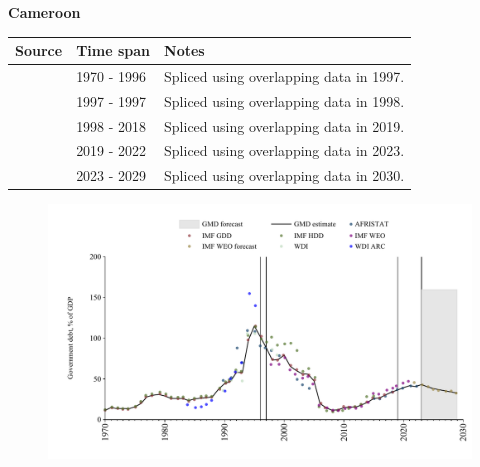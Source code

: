 \documentclass[12pt,a4paper,landscape]{article}
\begin{document}
\begin{adjustbox}{max totalsize={\paperwidth}{\paperheight},center}
\begin{minipage}[t][\textheight][t]{\textwidth}
\vspace*{0.5cm}
{}
\begin{center}
{\Large\bfseries Cameroon}
\end{center}
\vspace{0.5cm}
\begin{table}[H]
\centering
\small
\begin{tabular}{|l|l|l|}
\hline
\textbf{Source} & \textbf{Time span} & \textbf{Notes} \\
\hline
\rowcolor{white}\cite{IMF_GDD}& 1970 - 1996 &Spliced using overlapping data in 1997.\\
\rowcolor{lightgray}\cite{AFRISTAT}& 1997 - 1997 &Spliced using overlapping data in 1998.\\
\rowcolor{white}\cite{IMF_GDD}& 1998 - 2018 &Spliced using overlapping data in 2019.\\
\rowcolor{lightgray}\cite{AFRISTAT}& 2019 - 2022 &Spliced using overlapping data in 2023.\\
\rowcolor{white}\cite{IMF_WEO_forecast}& 2023 - 2029 &Spliced using overlapping data in 2030.\\
\hline
\end{tabular}
\end{table}
\begin{figure}[H]
\centering
\includegraphics[width=\textwidth,height=0.6\textheight,keepaspectratio]{graphs/CMR_govdebt_GDP.pdf}
\end{figure}
\end{minipage}
\end{adjustbox}
\end{document}

